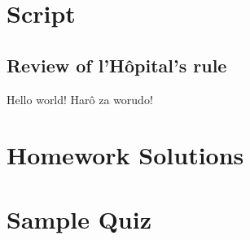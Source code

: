 \documentclass[article,oneside]{memoir}
\begin{document}
%
\author{\textti{\auth}}%
\title{\textti{\tight}}%
\date{\textti{\due}}%

\frontmatter
\maketitle%
\thispagestyle{empty}
\tableofcontents%

\newpage
\mainmatter
\chapter{Script}
\section{Review of l'Hôpital's rule}
\textsf{Hello world!} Harô za worudo!
\newpage
\chapter{Homework Solutions}
\newpage
\chapter{Sample Quiz}
\end{document}
